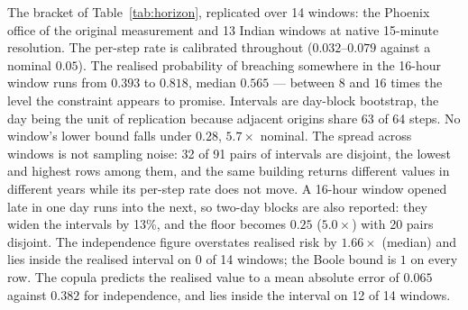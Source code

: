 \begin{table}[t]
\caption{The bracket of Table~\ref{tab:horizon}, replicated over 14 windows: the Phoenix office of the original measurement and 13 Indian windows at native 15-minute resolution. The per-step rate is calibrated throughout ($0.032$--$0.079$ against a nominal $0.05$). The realised probability of breaching somewhere in the 16-hour window runs from $0.393$ to $0.818$, median $0.565$ --- between $8$ and $16$ times the level the constraint appears to promise. Intervals are day-block bootstrap, the day being the unit of replication because adjacent origins share 63 of 64 steps. No window's lower bound falls under $0.28$, $5.7\times$ nominal. The spread across windows is not sampling noise: 32 of 91 pairs of intervals are disjoint, the lowest and highest rows among them, and the same building returns different values in different years while its per-step rate does not move. A 16-hour window opened late in one day runs into the next, so two-day blocks are also reported: they widen the intervals by 13\%, and the floor becomes $0.25$ ($5.0\times$) with 20 pairs disjoint. The independence figure overstates realised risk by $1.66\times$ (median) and lies inside the realised interval on 0 of 14 windows; the Boole bound is $1$ on every row. The copula predicts the realised value to a mean absolute error of $0.065$ against $0.382$ for independence, and lies inside the interval on 12 of 14 windows.}
\label{tab:horizon-panel}
\end{table}
